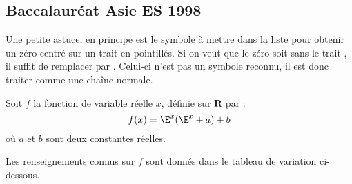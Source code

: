 \begin{tkzexample}
\end{tkzexample}


\subsection{Baccalauréat Asie ES 1998}
Une petite astuce, en principe   est le symbole à mettre dans la liste pour obtenir un zéro centré sur un trait en pointillés. Si on veut que le zéro soit sans le trait , il suffit de remplacer  par . Celui-ci n'est pas un symbole reconnu, il est donc traiter comme une chaîne normale.

  Soit $f$ la fonction de variable réelle $x$, définie sur $\mathbf{R}$ par :
  \[
      f(x)=\E^x(\E^x+a)+b
  \]
  où $a$ et $b$ sont deux constantes réelles.

  Les renseignements connus sur $f$ sont donnés dans le tableau de variation ci-dessous.
   
  \medskip
  \begin{center}
  \end{center}

